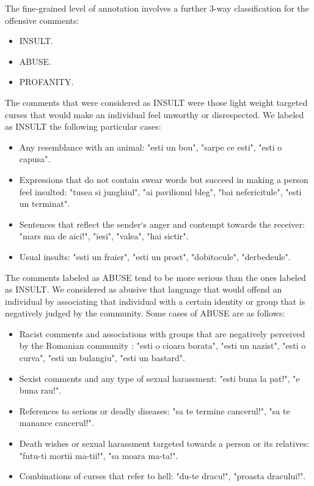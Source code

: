 \documentclass[12pt,a4paper]{report}
\begin{document}
The fine-grained level of annotation involves a further 3-way classification for the offensive comments:
\begin{itemize}
    \item INSULT.
    \item ABUSE.
    \item PROFANITY.
\end{itemize}

The comments that were considered as INSULT were those light weight targeted curses that would make an individual feel unworthy or disrespected. We labeled as INSULT the following particular cases:
\begin{itemize}
    \item Any resemblance with an animal: "esti un bou", "sarpe ce esti", "esti o capusa".
    \item Expressions that do not contain swear words but succeed in making a person feel insulted: "tusea si junghiul", "ai pavilionul bleg", "bai nefericitule", "esti un terminat".
    \item Sentences that reflect the sender`s anger and contempt towards the receiver: "mars ma de aici!", "iesi", "valea", "hai sictir".
    \item Usual insults: "esti un fraier", "esti un prost", "dobitocule", "derbedeule".
\end{itemize}

The comments labeled as ABUSE tend to be more serious than the ones labeled as INSULT. We considered as abusive that language that would offend an individual by associating that individual with a certain identity or group that is negatively judged by the community. Some cases of ABUSE are as follows:
\begin{itemize}
    \item Racist comments and associations with groups that are negatively perceived by the Romanian community : "esti o cioara borata", "esti un nazist", "esti o curva", "esti un bulangiu", "esti un bastard".
    \item Sexist comments and any type of sexual harassment: "esti buna la pat!", "e buna rau!".
    \item References to serious or deadly diseases: "sa te termine cancerul!", "sa te manance cancerul!".
    \item Death wishes or sexual harassment targeted towards a person or its relatives: "futu-ti mortii ma-tii!", "sa moara ma-ta!".
    \item Combinations of curses that refer to hell: "du-te dracu!", "proasta dracului!".
\end{itemize}
 
\end{document}
